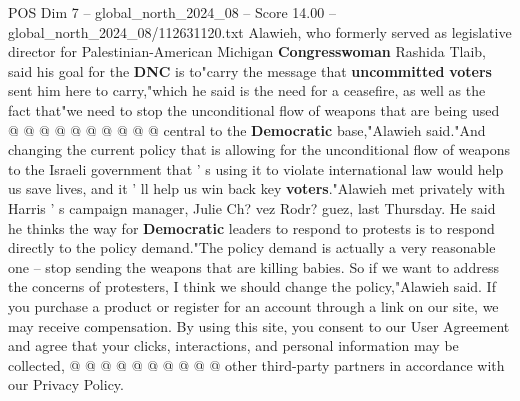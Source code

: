 \begin{textsample}{POS Dim 7 – global\_north\_2024\_08 – Score 14.00 – global\_north\_2024\_08/112631120.txt}
Alawieh, who formerly served as legislative director for Palestinian-American Michigan \textbf{Congresswoman} Rashida Tlaib, said his goal for the \textbf{DNC} is to"carry the message that \textbf{uncommitted} \textbf{voters} sent him here to carry,"which he said is the need for a ceasefire, as well as the fact that"we need to stop the unconditional flow of weapons that are being used @ @ @ @ @ @ @ @ @ @ central to the \textbf{Democratic} base,"Alawieh said."And changing the current policy that is allowing for the unconditional flow of weapons to the Israeli government that ' s using it to violate international law would help us save lives, and it ' ll help us win back key \textbf{voters}."Alawieh met privately with Harris ' s campaign manager, Julie Ch? vez Rodr? guez, last Thursday.
He said he thinks the way for \textbf{Democratic} leaders to respond to protests is to respond directly to the policy demand."The policy demand is actually a very reasonable one -- stop sending the weapons that are killing babies.
So if we want to address the concerns of protesters, I think we should change the policy,"Alawieh said.
If you purchase a product or register for an account through a link on our site, we may receive compensation.
By using this site, you consent to our User Agreement and agree that your clicks, interactions, and personal information may be collected, @ @ @ @ @ @ @ @ @ @ other third-party partners in accordance with our Privacy Policy.

\end{textsample}
